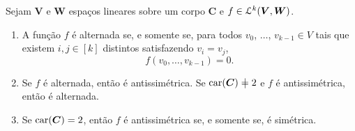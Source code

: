 \begin{proposition}
Sejam $\bm V$ e $\bm W$ espaços lineares sobre um corpo $\bm C$ e $f \in \mathcal{L}^k(\bm V,\bm W)$.
	\begin{enumerate}
	\item A função $f$ é alternada se, e somente se, para todos $v_0$, $\ldots$, $v_{k-1} \in V$ tais que existem $i,j \in [k]$ distintos satisfazendo $v_i = v_j$,
	\begin{equation*}
	f(v_0,\ldots,v_{k-1})=0.
	\end{equation*}
	\item Se $f$ é alternada, então é antissimétrica. Se $\car(\bm C) \neq 2$ e $f$ é antissimétrica, então é alternada.
	\item Se $\operatorname{car}(\bm C) = 2$, então $f$ é antissimétrica se, e somente se, é simétrica.
	\end{enumerate}
\end{proposition}
